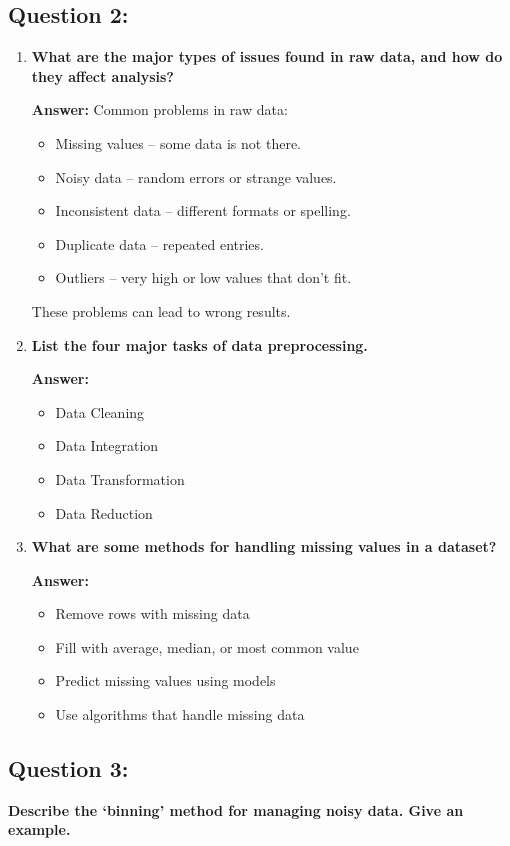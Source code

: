 \documentclass{article}
\begin{document}
\subsection*{Question 2:}
\begin{enumerate}[label=(\alph*)]
    \item \textbf{What are the major types of issues found in raw data, and how do they affect analysis?}
    
    \textbf{Answer:} Common problems in raw data:
    \begin{itemize}
        \item Missing values – some data is not there.
        \item Noisy data – random errors or strange values.
        \item Inconsistent data – different formats or spelling.
        \item Duplicate data – repeated entries.
        \item Outliers – very high or low values that don’t fit.
    \end{itemize}
    These problems can lead to wrong results.

    \item \textbf{List the four major tasks of data preprocessing.}

    \textbf{Answer:}
    \begin{itemize}
        \item Data Cleaning
        \item Data Integration
        \item Data Transformation
        \item Data Reduction
    \end{itemize}

    \item \textbf{What are some methods for handling missing values in a dataset?}

    \textbf{Answer:}
    \begin{itemize}
        \item Remove rows with missing data
        \item Fill with average, median, or most common value
        \item Predict missing values using models
        \item Use algorithms that handle missing data
    \end{itemize}
\end{enumerate}

\subsection*{Question 3:}
\textbf{Describe the ‘binning’ method for managing noisy data. Give an example.}
\end{document}
